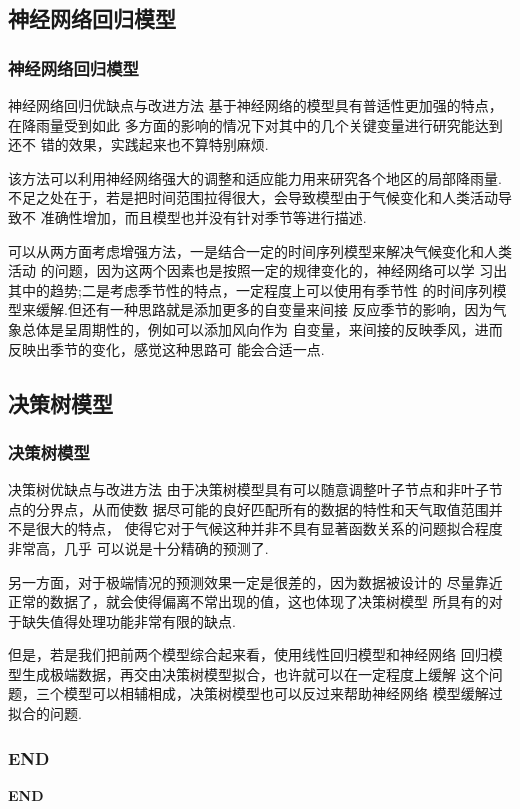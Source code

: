 \documentclass[10pt]{beamer}
\begin{document}
\subsection{神经网络回归模型}
\begin{frame}
	\frametitle{神经网络回归模型}
	\begin{block}{神经网络回归优缺点与改进方法}
		基于神经网络的模型具有普适性更加强的特点，在降雨量受到如此
		多方面的影响的情况下对其中的几个关键变量进行研究能达到还不
		错的效果，实践起来也不算特别麻烦.

		该方法可以利用神经网络强大的调整和适应能力用来研究各个地区的局部降雨量.
		不足之处在于，若是把时间范围拉得很大，会导致模型由于气候变化和人类活动导致不
		准确性增加，而且模型也并没有针对季节等进行描述.

		可以从两方面考虑增强方法，一是结合一定的时间序列模型来解决气候变化和人类活动
		的问题，因为这两个因素也是按照一定的规律变化的，神经网络可以学
		习出其中的趋势;二是考虑季节性的特点，一定程度上可以使用有季节性
		的时间序列模型来缓解.但还有一种思路就是添加更多的自变量来间接
		反应季节的影响，因为气象总体是呈周期性的，例如可以添加风向作为
		自变量，来间接的反映季风，进而反映出季节的变化，感觉这种思路可
		能会合适一点.
	\end{block}
\end{frame}

\subsection{决策树模型}
\begin{frame}
	\frametitle{决策树模型}
	\begin{block}{决策树优缺点与改进方法}
		由于决策树模型具有可以随意调整叶子节点和非叶子节点的分界点，从而使数
		据尽可能的良好匹配所有的数据的特性和天气取值范围并不是很大的特点，
		使得它对于气候这种并非不具有显著函数关系的问题拟合程度非常高，几乎
		可以说是十分精确的预测了.

		另一方面，对于极端情况的预测效果一定是很差的，因为数据被设计的
		尽量靠近正常的数据了，就会使得偏离不常出现的值，这也体现了决策树模型
		所具有的对于缺失值得处理功能非常有限的缺点.

		但是，若是我们把前两个模型综合起来看，使用线性回归模型和神经网络
		回归模型生成极端数据，再交由决策树模型拟合，也许就可以在一定程度上缓解
		这个问题，三个模型可以相辅相成，决策树模型也可以反过来帮助神经网络
		模型缓解过拟合的问题.
	\end{block}
\end{frame}

\begin{frame}
	\frametitle{END}
	\begin{center}
		\Huge
		\textbf{END}
	\end{center}
\end{frame}
\end{document}
